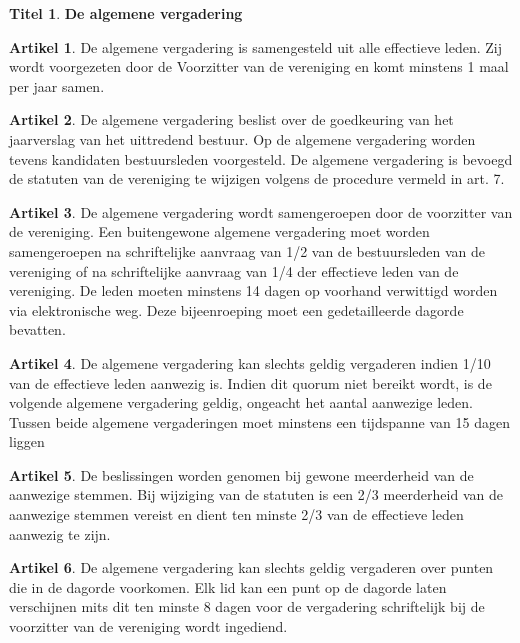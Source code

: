 \documentclass[a4paper,10pt]{article}
\theoremstyle{definition}
\newtheorem{titel}{\large Titel}
\newtheorem{artikel}{\large Artikel}
\newcommand{\ttext}[1]{\large \textbf{#1} \normalsize}
\newcommand{\hnl}{\hfill\newline}
\begin{document}

\begin{titel}\ttext{De algemene vergadering}

  \begin{artikel}\hnl
    De algemene vergadering is samengesteld uit alle effectieve leden.
    Zij wordt voorgezeten door de Voorzitter van de vereniging en komt minstens 1 maal per jaar samen.
  \end{artikel}

  \begin{artikel}\hnl
    De algemene vergadering beslist over de goedkeuring van het jaarverslag van het uittredend bestuur.
    Op de algemene vergadering worden tevens kandidaten bestuursleden voorgesteld.
    De algemene vergadering is bevoegd de statuten van de vereniging te wijzigen volgens de procedure vermeld in art. 7.
  \end{artikel}

  \begin{artikel}\hnl
    De algemene vergadering wordt samengeroepen door de voorzitter van de vereniging.
    Een buitengewone algemene vergadering moet worden samengeroepen na schriftelijke aanvraag van 1/2 van de bestuursleden van de vereniging of na schriftelijke aanvraag van 1/4 der effectieve leden van de vereniging.
    De leden moeten minstens 14 dagen op voorhand verwittigd worden via elektronische weg.
    Deze bijeenroeping moet een gedetailleerde dagorde bevatten.
  \end{artikel}

  \begin{artikel}\hnl
    De algemene vergadering kan slechts geldig vergaderen indien 1/10 van de effectieve leden aanwezig is.
    Indien dit quorum niet bereikt wordt, is de volgende algemene vergadering geldig, ongeacht het aantal aanwezige leden.
    Tussen beide algemene vergaderingen moet minstens een tijdspanne van 15 dagen liggen
  \end{artikel}

  \begin{artikel}\hnl
    De beslissingen worden genomen bij gewone meerderheid van de aanwezige stemmen.
    Bij wijziging van de statuten is een 2/3 meerderheid van de aanwezige stemmen vereist en dient ten minste 2/3 van de effectieve leden aanwezig te zijn.
  \end{artikel}

  \begin{artikel}\hnl
    De algemene vergadering kan slechts geldig vergaderen over punten die in de dagorde voorkomen.
    Elk lid kan een punt op de dagorde laten verschijnen mits dit ten minste 8 dagen voor de vergadering schriftelijk bij de voorzitter van de vereniging wordt ingediend.
  \end{artikel}

\end{titel}
\end{document}
